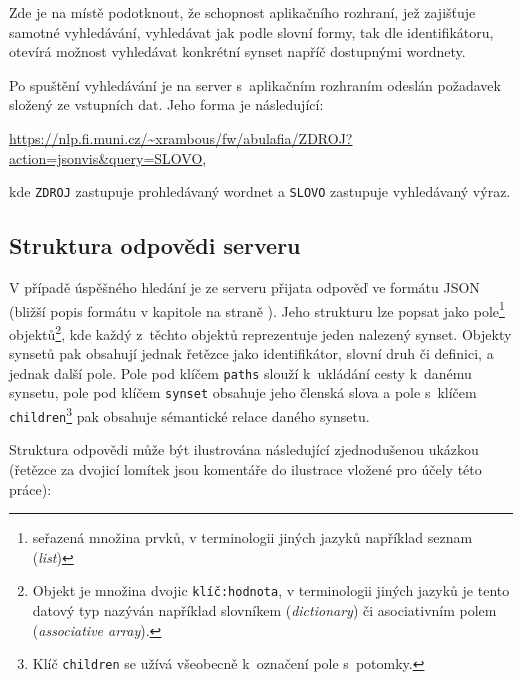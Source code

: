 \documentclass[a4paper, 11pt, oneside, showtrims]{book}
\newcommand{\itNameRef}[1]{\textit{\nameref{#1}}}
\begin{document}
					Zde je na místě podotknout, že schopnost aplikačního rozhraní, jež zajišťuje samotné vyhledávání, vyhledávat jak podle slovní formy, tak dle identifikátoru, otevírá možnost vyhledávat konkrétní synset napříč dostupnými wordnety. 

					Po spuštění vyhledávání je na server s~aplikačním rozhraním odeslán požadavek složený ze vstupních dat. Jeho forma je následující:

					\medskip
					\url{https://nlp.fi.muni.cz/~xrambous/fw/abulafia/ZDROJ?action=jsonvis&query=SLOVO}\hspace{1em},
					\medskip

					kde \texttt{ZDROJ} zastupuje prohledávaný wordnet a \texttt{SLOVO} zastupuje vyhledávaný výraz.

				\subsection{Struktura odpovědi serveru}
				\label{cha:answerStruct}

					V případě úspěšného hledání je ze serveru přijata odpověď ve formátu JSON (bližší popis formátu v kapitole \itNameRef{cha:json} na straně \pageref{cha:json}). Jeho strukturu lze popsat jako pole\footnote{seřazená množina prvků, v terminologii jiných jazyků například seznam (\textit{list})} objektů\footnote{Objekt je množina dvojic \texttt{klíč:hodnota}, v terminologii jiných jazyků je tento datový typ nazýván například slovníkem (\textit{dictionary}) či asociativním polem (\textit{associative array}).}, kde každý z~těchto objektů reprezentuje jeden nalezený synset. Objekty synsetů pak obsahují jednak řetězce jako identifikátor, slovní druh či definici, a jednak další pole. Pole pod klíčem \texttt{paths} slouží k~ukládání cesty k~danému synsetu, pole pod klíčem \texttt{synset} obsahuje jeho členská slova a pole s~klíčem \texttt{children}\footnote{Klíč \texttt{children} se užívá všeobecně k~označení pole s~potomky.} pak obsahuje sémantické relace daného synsetu. 

					Struktura odpovědi může být ilustrována následující zjednodušenou ukázkou (řetězce za dvojicí lomítek jsou komentáře do ilustrace vložené pro účely této práce):
\end{document}
